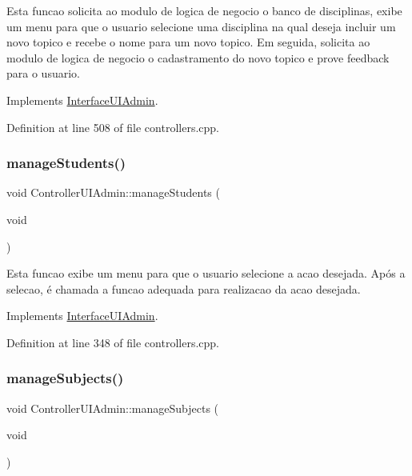 Esta funcao solicita ao modulo de logica de negocio o banco de disciplinas, exibe um menu para que o usuario selecione uma disciplina na qual deseja incluir um novo topico e recebe o nome para um novo topico. Em seguida, solicita ao modulo de logica de negocio o cadastramento do novo topico e prove feedback para o usuario. 

Implements \hyperlink{class_interface_u_i_admin_a819252ab207a578d42807db748f867cd}{Interface\+U\+I\+Admin}.



Definition at line 508 of file controllers.\+cpp.

\mbox{\label{class_controller_u_i_admin_ad77ca0f143bc938b48198d91b1be031b}} 
\subsubsection{\texorpdfstring{manage\+Students()}{manageStudents()}}
{\footnotesize\ttfamily void Controller\+U\+I\+Admin\+::manage\+Students (\begin{DoxyParamCaption}\item[{void}]{ }\end{DoxyParamCaption})\hspace{0.3cm}{\ttfamily [virtual]}}

Esta funcao exibe um menu para que o usuario selecione a acao desejada. Após a selecao, é chamada a funcao adequada para realizacao da acao desejada. 

Implements \hyperlink{class_interface_u_i_admin_a4cfdde0e6b96ced849e26c75c7de2077}{Interface\+U\+I\+Admin}.



Definition at line 348 of file controllers.\+cpp.

\mbox{\label{class_controller_u_i_admin_a1e09e8b10c0f2261e307d9e9023daaa4}} 
\subsubsection{\texorpdfstring{manage\+Subjects()}{manageSubjects()}}
{\footnotesize\ttfamily void Controller\+U\+I\+Admin\+::manage\+Subjects (\begin{DoxyParamCaption}\item[{void}]{ }\end{DoxyParamCaption})\hspace{0.3cm}{\ttfamily [virtual]}}

